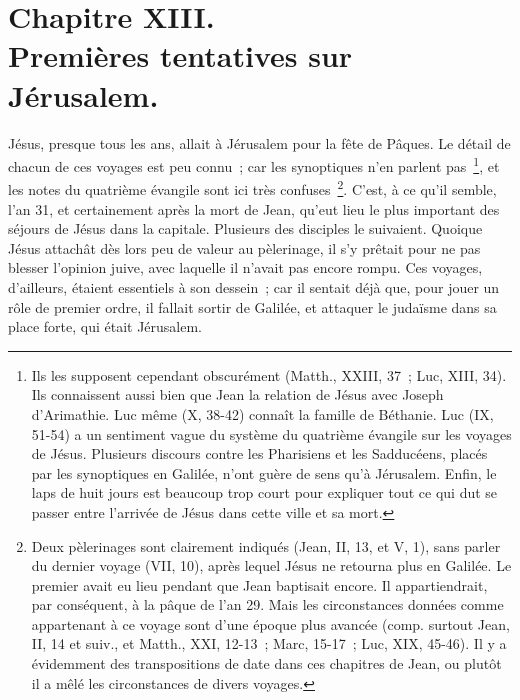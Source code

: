 \documentclass[french,twoside]{book} %
\newcommand\chapteropen{} %
\newcommand\chaptercont{} %
\begin{document}
\chapteropen
\chapter[{Chapitre XIII. Premières tentatives sur Jérusalem.}]{Chapitre XIII.\\
Premières tentatives sur Jérusalem.}\renewcommand{\leftmark}{Chapitre XIII.\\
Premières tentatives sur Jérusalem.}


\chaptercont
\noindent Jésus, presque tous les ans, allait à Jérusalem pour la fête de Pâques. Le détail de chacun de ces voyages est peu connu ; car les synoptiques n’en parlent pas \footnote{Ils les supposent cependant obscurément (Matth., XXIII, 37 ; Luc, XIII, 34). Ils connaissent aussi bien que Jean la relation de Jésus avec Joseph d’Arimathie. Luc même (X, 38-42) connaît la famille de Béthanie. Luc (IX, 51-54) a un sentiment vague du système du quatrième évangile sur les voyages de Jésus. Plusieurs discours contre les Pharisiens et les Sadducéens, placés par les synoptiques en Galilée, n’ont guère de sens qu’à Jérusalem. Enfin, le laps de huit jours est beaucoup trop court pour expliquer tout ce qui dut se passer entre l’arrivée de Jésus dans cette ville et sa mort.}, et les notes du quatrième évangile sont ici très confuses \footnote{Deux pèlerinages sont clairement indiqués (Jean, II, 13, et V, 1), sans parler du dernier voyage (VII, 10), après lequel Jésus ne retourna plus en Galilée. Le premier avait eu lieu pendant que Jean baptisait encore. Il appartiendrait, par conséquent, à la pâque de l’an 29. Mais les circonstances données comme appartenant à ce voyage sont d’une époque plus avancée (comp. surtout Jean, II, 14 et suiv., et Matth., XXI, 12-13 ; Marc, 15-17 ; Luc, XIX, 45-46). Il y a évidemment des transpositions de date dans ces chapitres de Jean, ou plutôt il a mêlé les circonstances de divers voyages.}. C’est, à ce qu’il semble, l’an 31, et certainement après la mort de Jean, qu’eut lieu le plus important des séjours de Jésus dans la capitale. Plusieurs des disciples le suivaient. Quoique Jésus attachât dès lors peu de valeur au pèlerinage, il s’y prêtait pour ne pas blesser l’opinion juive, avec laquelle il n’avait pas encore rompu. Ces voyages, d’ailleurs, étaient essentiels à son dessein ; car il sentait déjà que, pour jouer un rôle de premier ordre, il fallait sortir de Galilée, et attaquer le judaïsme dans sa place forte, qui était Jérusalem.\par
\end{document}
